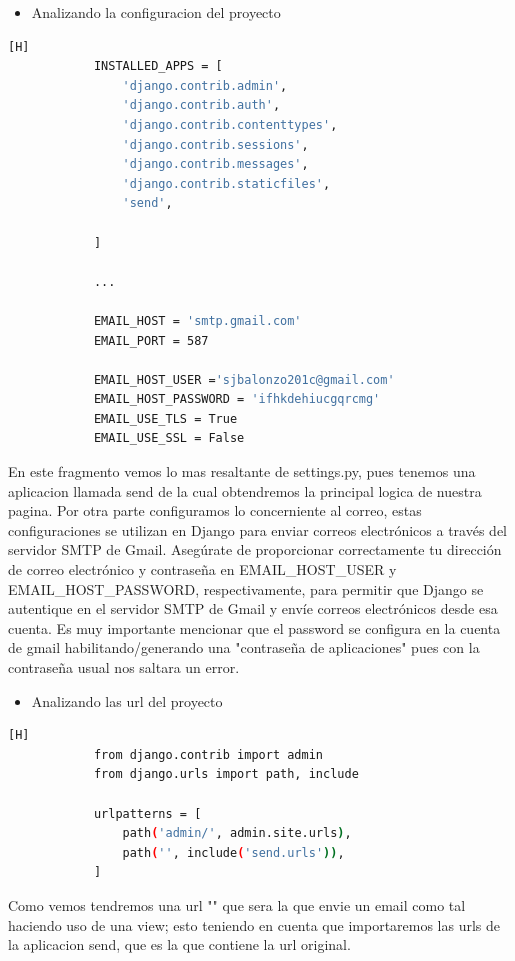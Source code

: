 \documentclass{article}
\begin{document}
        \begin{itemize}
            \item Analizando la configuracion del proyecto
        \end{itemize}
        \begin{lstlisting}[language=bash,caption={Archivo settings.py}][H]
            INSTALLED_APPS = [
                'django.contrib.admin',
                'django.contrib.auth',
                'django.contrib.contenttypes',
                'django.contrib.sessions',
                'django.contrib.messages',
                'django.contrib.staticfiles',
                'send',
                
            ]

            ...

            EMAIL_HOST = 'smtp.gmail.com'
            EMAIL_PORT = 587
            
            EMAIL_HOST_USER ='sjbalonzo201c@gmail.com'
            EMAIL_HOST_PASSWORD = 'ifhkdehiucgqrcmg'
            EMAIL_USE_TLS = True
            EMAIL_USE_SSL = False
	\end{lstlisting}
        En este fragmento vemos lo mas resaltante de settings.py, pues tenemos una aplicacion llamada send de la cual obtendremos la principal logica de nuestra pagina.
        Por otra parte configuramos lo concerniente al correo, estas configuraciones se utilizan en Django para enviar correos electrónicos a través del servidor SMTP de Gmail. Asegúrate de proporcionar correctamente tu dirección de correo electrónico y contraseña en EMAIL\_HOST\_USER y EMAIL\_HOST\_PASSWORD, respectivamente, para permitir que Django se autentique en el servidor SMTP de Gmail y envíe correos electrónicos desde esa cuenta.
        Es muy importante mencionar que el password se configura en la cuenta de gmail habilitando/generando una "contraseña de aplicaciones" pues con la contraseña usual nos saltara un error.
        \newline

        \begin{itemize}
            \item Analizando las url del proyecto
        \end{itemize}
        \begin{lstlisting}[language=bash,caption={Archivo urls.py}][H]
            from django.contrib import admin
            from django.urls import path, include
            
            urlpatterns = [
                path('admin/', admin.site.urls),
                path('', include('send.urls')),
            ]
	\end{lstlisting}
        Como vemos tendremos una url "" que sera la que envie un email como tal haciendo uso de una view; esto teniendo en cuenta que importaremos las urls de la aplicacion send, que es la que contiene la url original.
\end{document}
